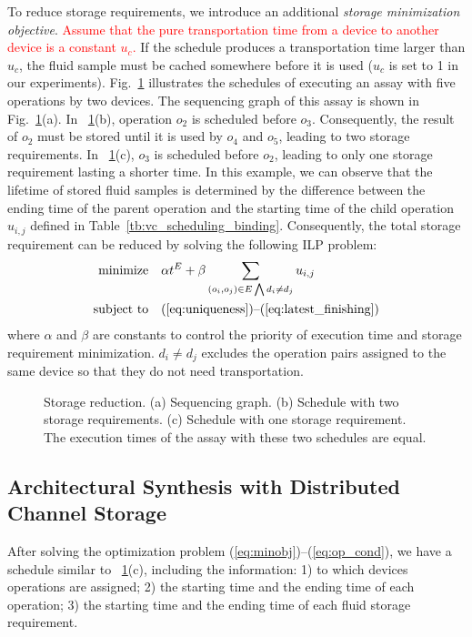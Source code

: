 To reduce storage requirements, we introduce an additional \textit{storage minimization
objective}.
\textcolor{red}{Assume that the pure transportation time from a device to another device
is a constant $u_c$.}
If the schedule produces a transportation time larger
than $u_c$, the fluid sample must be cached somewhere before it is
used ($u_c$ is set to 1 in our experiments).
Fig.~\ref{fig:schedule_storage} illustrates
the schedules of executing an assay with five operations by two devices. The sequencing graph of this assay is shown in Fig.~\ref{fig:schedule_storage}(a).
In \figname~\ref{fig:schedule_storage}(b),
operation $o_2$ is scheduled before $o_3$. Consequently, the result of $o_2$
must be stored until it is used by $o_4$ and $o_5$, leading to two storage
requirements. %
In \figname~\ref{fig:schedule_storage}(c), $o_3$ is scheduled before $o_2$,
leading to only one storage requirement lasting a shorter time.
In this example, we can observe that
the lifetime of stored fluid samples is determined by the difference between
the ending time of the parent operation and the starting time of the child
operation $u_{i,j}$ defined in Table~\ref{tb:vc_scheduling_binding}. Consequently, the total storage requirement can be reduced by
solving the following ILP problem:
\begin{align}
\text{minimize} & \quad \alpha t^E+\beta\sum_{{(o_i,o_j)\in E\bigwedge d_i\ne d_j }}u_{i,j}
 \label{eq:minobj}\\
\text{subject to} & \quad
\text{(\ref{eq:uniqueness})--(\ref{eq:latest_finishing}})\label{eq:op_cond}
\end{align}
where $\alpha$ and $\beta$ are constants to control the priority of
execution time and storage requirement minimization.
$d_i \ne d_j $ excludes the operation pairs assigned to the same device
so that they do not need transportation.


\begin{figure}[t]
{\figurefontsize
\centering

\caption{Storage reduction. (a) Sequencing graph. (b) Schedule with two
storage requirements. (c) Schedule with one storage requirement. The execution
times of the assay with these two schedules are equal. }
\label{fig:schedule_storage}
}
\end{figure}



\subsection{Architectural Synthesis with Distributed Channel Storage}\label{sec:channel_storage_synthesis}
After solving the
optimization problem (\ref{eq:minobj})--(\ref{eq:op_cond}), we have a schedule
similar to \figname~\ref{fig:schedule_storage}(c),
including the information: 1) to which devices operations are
assigned; 2) the starting time and the ending time of each operation; 3) the
starting time and the ending time of each fluid storage requirement.

